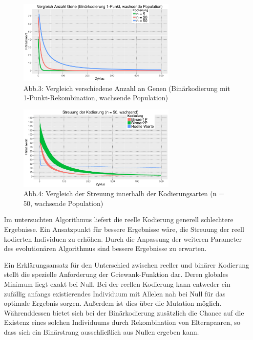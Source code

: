 \documentclass[12pt,
    a4paper,
    headinclude,
    footinclude]{scrreprt}
\begin{document}
\begin{figure}[H]
	\centering
	\includegraphics[width=0.7\textwidth]{../abb3_different_n.jpeg} 
	
	\caption*{Abb.3: Vergleich verschiedene Anzahl an Genen (Binärkodierung mit 1-Punkt-Rekombination, wachsende Population)} 
	\label{InputOutput}
\end{figure}


	\begin{figure}[H]
		\centering
		\includegraphics[width=0.7\textwidth]{../abb4_streuung.jpeg} 
		
		\caption*{Abb.4: Vergleich der Streuung innerhalb der Kodierungsarten (n = 50, wachsende Population)} 
		\label{InputOutput}
	\end{figure}

Im untersuchten Algorithmus liefert die reelle Kodierung generell schlechtere Ergebnisse. Ein Ansatzpunkt für bessere Ergebnisse  wäre, die Streuung der reell kodierten Individuen zu erhöhen. Durch die Anpassung  der weiteren Parameter des evolutionären Algorithmus sind bessere Ergebnisse zu erwarten. 

Ein Erklärungsansatz für den Unterschied zwischen reeller und binärer Kodierung stellt die spezielle Anforderung der Griewank-Funktion dar. Deren globales Minimum liegt exakt bei Null. Bei der reellen Kodierung kann entweder ein zufällig anfangs existierendes Individuum mit Allelen nah bei Null für das optimale Ergebnis sorgen. Außerdem ist dies über die Mutation möglich. 
Währenddessen bietet sich bei der Binärkodierung zusätzlich die Chance auf die Existenz eines solchen Individuums durch Rekombination von Elternpaaren, so dass sich ein Binärstrang ausschließlich aus Nullen ergeben kann.
\end{document}
